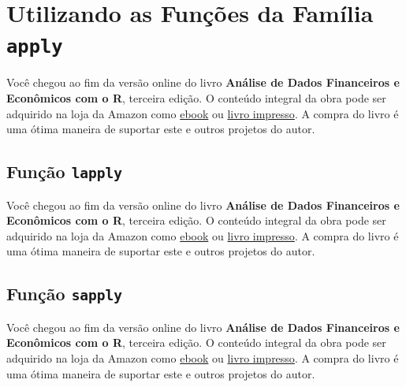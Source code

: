 \documentclass[
  11pt,
]{book}
\newenvironment{pleasebuyit}
{\begin{noteblock}
		
	} {\end{noteblock}}
\begin{document}
\hypertarget{utilizando-as-funuxe7uxf5es-da-famuxedlia-apply}{%
\section{\texorpdfstring{Utilizando as Funções da Família \texttt{apply}}{Utilizando as Funções da Família apply}}\label{utilizando-as-funuxe7uxf5es-da-famuxedlia-apply}}

\begin{pleasebuyit}
Você chegou ao fim da versão online do livro \textbf{Análise de Dados
Financeiros e Econômicos com o R}, terceira edição. O conteúdo integral
da obra pode ser adquirido na loja da Amazon como
\href{https://www.amazon.com.br/dp/B08WNC27ZY}{ebook} ou
\href{https://www.amazon.com/dp/B08WP8CCDB}{livro impresso}. A compra do
livro é uma ótima maneira de suportar este e outros projetos do autor.
\end{pleasebuyit}

\hypertarget{funuxe7uxe3o-lapply}{%
\subsection{\texorpdfstring{Função \texttt{lapply}}{Função lapply}}\label{funuxe7uxe3o-lapply}}

\begin{pleasebuyit}
Você chegou ao fim da versão online do livro \textbf{Análise de Dados
Financeiros e Econômicos com o R}, terceira edição. O conteúdo integral
da obra pode ser adquirido na loja da Amazon como
\href{https://www.amazon.com.br/dp/B08WNC27ZY}{ebook} ou
\href{https://www.amazon.com/dp/B08WP8CCDB}{livro impresso}. A compra do
livro é uma ótima maneira de suportar este e outros projetos do autor.
\end{pleasebuyit}

\hypertarget{funuxe7uxe3o-sapply}{%
\subsection{\texorpdfstring{Função \texttt{sapply}}{Função sapply}}\label{funuxe7uxe3o-sapply}}

\begin{pleasebuyit}
Você chegou ao fim da versão online do livro \textbf{Análise de Dados
Financeiros e Econômicos com o R}, terceira edição. O conteúdo integral
da obra pode ser adquirido na loja da Amazon como
\href{https://www.amazon.com.br/dp/B08WNC27ZY}{ebook} ou
\href{https://www.amazon.com/dp/B08WP8CCDB}{livro impresso}. A compra do
livro é uma ótima maneira de suportar este e outros projetos do autor.
\end{pleasebuyit}
\end{document}
